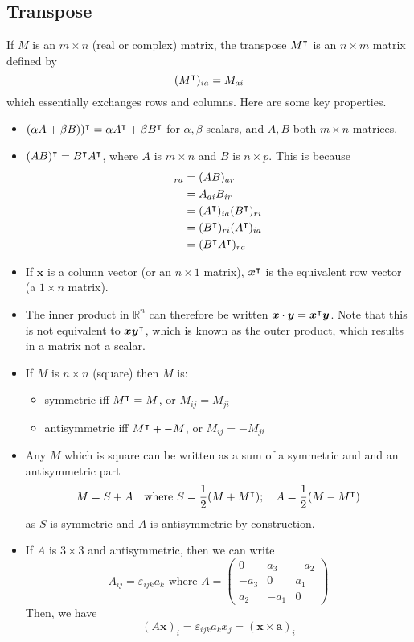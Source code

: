 \documentclass{article}
\begin{document}
\subsection{Transpose}
If $M$ is an $m \times n$ (real or complex) matrix, the transpose $M^\intercal$ is an $n \times m$ matrix defined by
\[ (M^\intercal)_{ia} = M_{ai} \]
which essentially exchanges rows and columns. Here are some key properties.
\begin{itemize}
	\item $(\alpha A + \beta B))^\intercal = \alpha A^\intercal + \beta B^\intercal$ for $\alpha, \beta$ scalars, and $A, B$ both $m \times n$ matrices.
	\item $(AB)^\intercal = B^\intercal A^\intercal$, where $A$ is $m \times n$ and $B$ is $n \times p$. This is because
	      \begin{align*}
		      [(AB)^\transpose]_{ra} & = (AB)_{ar}                               \\
		                             & = A_{ai} B_{ir}                           \\
		                             & = (A^\transpose)_{ia} (B^\transpose)_{ri} \\
		                             & = (B^\transpose)_{ri} (A^\transpose)_{ia} \\
		                             & = (B^\transpose A^\transpose)_{ra}
	      \end{align*}
	\item If $\bm x$ is a column vector (or an $n \times 1$ matrix), $\bm x^\intercal$ is the equivalent row vector (a $1 \times n$ matrix).
	\item The inner product in $\mathbb R^n$ can therefore be written $\bm x \cdot \bm y = \bm x^\intercal \bm y$. Note that this is not equivalent to $\bm x \bm y^\intercal$, which is known as the outer product, which results in a matrix not a scalar.
	\item If $M$ is $n \times n$ (square) then $M$ is:
	      \begin{itemize}
		      \item symmetric iff $M^\intercal = M$, or $M_{ij} = M_{ji}$
		      \item antisymmetric iff $M^\intercal + -M$, or $M_{ij} = -M_{ji}$
	      \end{itemize}
	\item Any $M$ which is square can be written as a sum of a symmetric and and an antisymmetric part
	      \[ M = S + A\quad\text{where } S = \frac{1}{2}(M + M^\intercal);\quad A = \frac{1}{2}(M - M^\intercal) \]
	      as $S$ is symmetric and $A$ is antisymmetric by construction.
	\item If $A$ is $3 \times 3$ and antisymmetric, then we can write
	      \[ A_{ij} = \varepsilon_{ijk}a_k\text{ where } A = \begin{pmatrix}
			      0    & a_3  & -a_2 \\
			      -a_3 & 0    & a_1  \\
			      a_2  & -a_1 & 0
		      \end{pmatrix} \]
	      Then, we have
	      \[
		      (A \bm x)_i = \varepsilon_{ijk}a_k x_j = (\bm x \times \bm a)_i
	      \]
\end{itemize}
\end{document}
